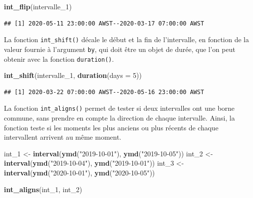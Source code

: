 \documentclass[
  11pt,
]{book}
\newenvironment{Shaded}{\begin{snugshade}}{\end{snugshade}}
\newcommand{\DataTypeTok}[1]{\textcolor[rgb]{0.13,0.29,0.53}{#1}}
\newcommand{\DecValTok}[1]{\textcolor[rgb]{0.00,0.00,0.81}{#1}}
\newcommand{\KeywordTok}[1]{\textcolor[rgb]{0.13,0.29,0.53}{\textbf{#1}}}
\newcommand{\NormalTok}[1]{#1}
\newcommand{\StringTok}[1]{\textcolor[rgb]{0.31,0.60,0.02}{#1}}
\numberwithin{equation}{section}
\numberwithin{countremarque}{section}
\begin{document}
\begin{Shaded}
\begin{Highlighting}[]
\KeywordTok{int\_flip}\NormalTok{(intervalle\_}\DecValTok{1}\NormalTok{)}
\end{Highlighting}
\end{Shaded}

\begin{lstlisting}
## [1] 2020-05-11 23:00:00 AWST--2020-03-17 07:00:00 AWST
\end{lstlisting}

La fonction \texttt{int\_shift()} décale le début et la fin de l'intervalle, en fonction de la valeur fournie à l'argument \texttt{by}, qui doit être un objet de durée, que l'on peut obtenir avec la fonction \texttt{duration()}.

\begin{Shaded}
\begin{Highlighting}[]
\KeywordTok{int\_shift}\NormalTok{(intervalle\_}\DecValTok{1}\NormalTok{, }\KeywordTok{duration}\NormalTok{(}\DataTypeTok{days =} \DecValTok{5}\NormalTok{))}
\end{Highlighting}
\end{Shaded}

\begin{lstlisting}
## [1] 2020-03-22 07:00:00 AWST--2020-05-16 23:00:00 AWST
\end{lstlisting}

La fonction \texttt{int\_aligns()} permet de tester si deux intervalles ont une borne commune, sans prendre en compte la direction de chaque intervalle. Ainsi, la fonction teste si les moments les plus anciens ou plus récents de chaque intervallent arrivent au même moment.

\begin{Shaded}
\begin{Highlighting}[]
\NormalTok{int\_}\DecValTok{1}\NormalTok{ \textless{}{-}}\StringTok{ }\KeywordTok{interval}\NormalTok{(}\KeywordTok{ymd}\NormalTok{(}\StringTok{"2019{-}10{-}01"}\NormalTok{), }\KeywordTok{ymd}\NormalTok{(}\StringTok{"2019{-}10{-}05"}\NormalTok{))}
\NormalTok{int\_}\DecValTok{2}\NormalTok{ \textless{}{-}}\StringTok{ }\KeywordTok{interval}\NormalTok{(}\KeywordTok{ymd}\NormalTok{(}\StringTok{"2019{-}10{-}04"}\NormalTok{), }\KeywordTok{ymd}\NormalTok{(}\StringTok{"2019{-}10{-}01"}\NormalTok{))}
\NormalTok{int\_}\DecValTok{3}\NormalTok{ \textless{}{-}}\StringTok{ }\KeywordTok{interval}\NormalTok{(}\KeywordTok{ymd}\NormalTok{(}\StringTok{"2020{-}10{-}01"}\NormalTok{), }\KeywordTok{ymd}\NormalTok{(}\StringTok{"2020{-}10{-}05"}\NormalTok{))}

\KeywordTok{int\_aligns}\NormalTok{(int\_}\DecValTok{1}\NormalTok{, int\_}\DecValTok{2}\NormalTok{)}
\end{Highlighting}
\end{Shaded}
\end{document}
